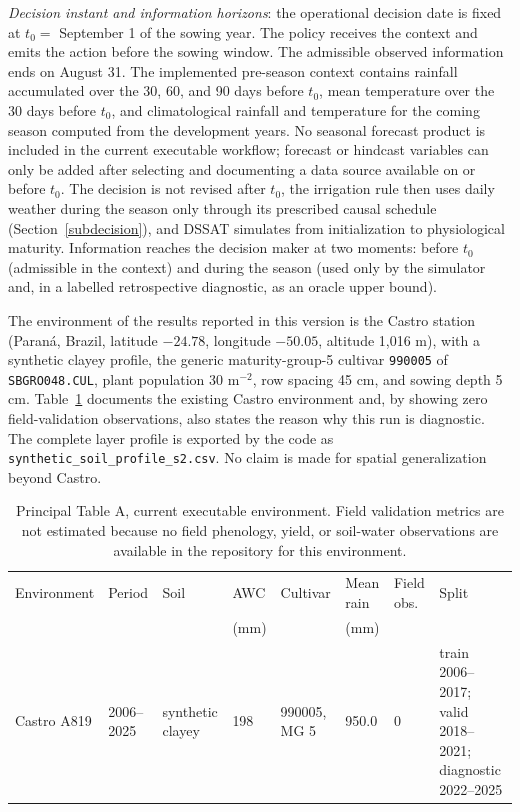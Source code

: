 \documentclass[times,final,authoryear]{elsarticle}
\begin{document}
\emph{Decision instant and information horizons}: the operational decision date is fixed at $t_0=$ September 1 of the sowing year. The policy receives the context and emits the action before the sowing window. The admissible observed information ends on August 31. The implemented pre-season context contains rainfall accumulated over the 30, 60, and 90 days before $t_0$, mean temperature over the 30 days before $t_0$, and climatological rainfall and temperature for the coming season computed from the development years. No seasonal forecast product is included in the current executable workflow; forecast or hindcast variables can only be added after selecting and documenting a data source available on or before $t_0$. The decision is not revised after $t_0$, the irrigation rule then uses daily weather during the season only through its prescribed causal schedule (Section~\ref{subdecision}), and DSSAT simulates from initialization to physiological maturity. Information reaches the decision maker at two moments: before $t_0$ (admissible in the context) and during the season (used only by the simulator and, in a labelled retrospective diagnostic, as an oracle upper bound).

The environment of the results reported in this version is the Castro station (Paraná, Brazil, latitude $-24.78$, longitude $-50.05$, altitude 1,016 m), with a synthetic clayey profile, the generic maturity-group-5 cultivar \texttt{990005} of \texttt{SBGRO048.CUL}, plant population 30 m$^{-2}$, row spacing 45 cm, and sowing depth 5 cm. Table~\ref{tab_environment_a_current} documents the existing Castro environment and, by showing zero field-validation observations, also states the reason why this run is diagnostic. The complete layer profile is exported by the code as \texttt{synthetic\_soil\_profile\_s2.csv}. No claim is made for spatial generalization beyond Castro.

\begin{table}[!h]
\centering
\scriptsize
\caption{Principal Table A, current executable environment. Field validation metrics are not estimated because no field phenology, yield, or soil-water observations are available in the repository for this environment.}
\label{tab_environment_a_current}
\begin{tabular}{p{2.0cm}p{1.3cm}p{1.8cm}p{1.4cm}p{1.3cm}p{1.6cm}p{1.4cm}p{1.7cm}}
\hline
Environment & Period & Soil & AWC & Cultivar & Mean rain & Field obs. & Split \\
            &        &      & (mm) &          & (mm)      &            & \\
\hline
Castro A819 & 2006--2025 & synthetic clayey & 198 & 990005, MG 5 & 950.0 & 0 & train 2006--2017; valid 2018--2021; diagnostic 2022--2025 \\
\hline
\end{tabular}
\end{table}
\end{document}
